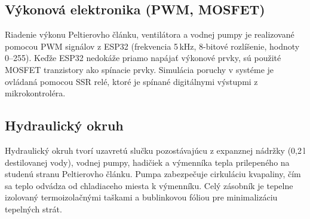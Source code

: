 \subsection{Výkonová elektronika (PWM, MOSFET)}

Riadenie výkonu Peltierovho článku, ventilátora a vodnej pumpy je realizované pomocou PWM signálov z ESP32 (frekvencia 5\,kHz, 8-bitové rozlíšenie, hodnoty 0--255). Keďže ESP32 nedokáže priamo napájať výkonové prvky, sú použité MOSFET tranzistory ako spínacie prvky. Simulácia poruchy v systéme je ovládaná pomocou SSR relé, ktoré je spínané digitálnymi výstupmi z mikrokontroléra.

\subsection{Hydraulický okruh}

Hydraulický okruh tvorí uzavretú slučku pozostávajúcu z expanznej nádržky (0,2\,l destilovanej vody), vodnej pumpy, hadičiek a výmenníka tepla prilepeného na studenú stranu Peltierovho článku. Pumpa zabezpečuje cirkuláciu kvapaliny, čím sa teplo odvádza od chladiaceho miesta k výmenníku. Celý zásobník je tepelne izolovaný termoizolačnými taškami a bublinkovou fóliou pre minimalizáciu tepelných strát.
